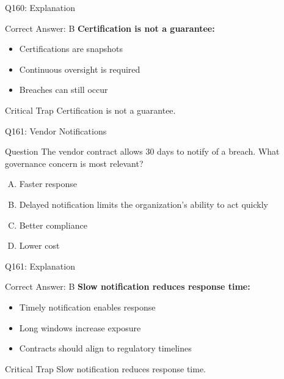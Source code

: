 \documentclass{beamer}
\begin{document}
	\begin{frame}{Q160: Explanation}
		\begin{block}{Correct Answer: B}
			\textbf{Certification is not a guarantee:}
			\begin{itemize}
				\item Certifications are snapshots
				\item Continuous oversight is required
				\item Breaches can still occur
			\end{itemize}
		\end{block}
		\begin{alertblock}{Critical Trap}
			Certification is not a guarantee.
		\end{alertblock}
	\end{frame}
	
	\begin{frame}{Q161: Vendor Notifications}
		\begin{block}{Question}
			The vendor contract allows 30 days to notify of a breach. What governance concern is most relevant?
		\end{block}
		\begin{enumerate}[(A)]
			\item Faster response
			\item Delayed notification limits the organization's ability to act quickly
			\item Better compliance
			\item Lower cost
		\end{enumerate}
	\end{frame}
	
	\begin{frame}{Q161: Explanation}
		\begin{block}{Correct Answer: B}
			\textbf{Slow notification reduces response time:}
			\begin{itemize}
				\item Timely notification enables response
				\item Long windows increase exposure
				\item Contracts should align to regulatory timelines
			\end{itemize}
		\end{block}
		\begin{alertblock}{Critical Trap}
			Slow notification reduces response time.
		\end{alertblock}
	\end{frame}
	
\end{document}
